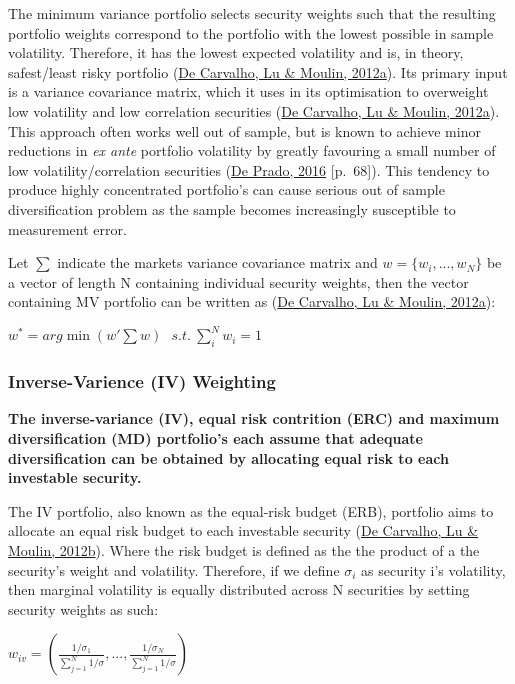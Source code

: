 \documentclass[11pt,preprint, authoryear]{elsarticle}
\numberwithin{equation}{section}
\numberwithin{figure}{section}
\numberwithin{table}{section}
\begin{document}
The minimum variance portfolio selects security weights such that the
resulting portfolio weights correspond to the portfolio with the lowest
possible in sample volatility. Therefore, it has the lowest expected
volatility and is, in theory, safest/least risky portfolio
(\protect\hyperlink{ref-rawl2012}{De Carvalho, Lu \& Moulin, 2012a}).
Its primary input is a variance covariance matrix, which it uses in its
optimisation to overweight low volatility and low correlation securities
(\protect\hyperlink{ref-rawl2012}{De Carvalho, Lu \& Moulin, 2012a}).
This approach often works well out of sample, but is known to achieve
minor reductions in \emph{ex ante} portfolio volatility by greatly
favouring a small number of low volatility/correlation securities
(\protect\hyperlink{ref-lopez}{De Prado, 2016} {[}p.~68{]}). This
tendency to produce highly concentrated portfolio's can cause serious
out of sample diversification problem as the sample becomes increasingly
susceptible to measurement error.

Let \(\sum\) indicate the markets variance covariance matrix and
\(w=\{w_i,..., w_N \}\) be a vector of length N containing individual
security weights, then the vector containing MV portfolio can be written
as (\protect\hyperlink{ref-rawl2012}{De Carvalho, Lu \& Moulin, 2012a}):

\(w^*=arg\min(w'\sum w)\ \ \ s.t.\ \sum^N_iw_i=1\)

\hypertarget{inverse-varience-iv-weighting}{%
\subsubsection{Inverse-Varience (IV)
Weighting}\label{inverse-varience-iv-weighting}}

\textbf{The inverse-variance (IV), equal risk contrition (ERC) and
maximum diversification (MD) portfolio's each assume that adequate
diversification can be obtained by allocating equal risk to each
investable security.}

The IV portfolio, also known as the equal-risk budget (ERB), portfolio
aims to allocate an equal risk budget to each investable security
(\protect\hyperlink{ref-leote}{De Carvalho, Lu \& Moulin, 2012b}). Where
the risk budget is defined as the the product of a the security's weight
and volatility. Therefore, if we define \(\sigma_i\) as security i's
volatility, then marginal volatility is equally distributed across N
securities by setting security weights as such:

\(w_{iv}=(\frac{1/\sigma_1}{\sum^N_{j=1} 1/\sigma}, ...,\frac{1/\sigma_N}{\sum^N_{j=1} 1/\sigma} )\)
\end{document}
